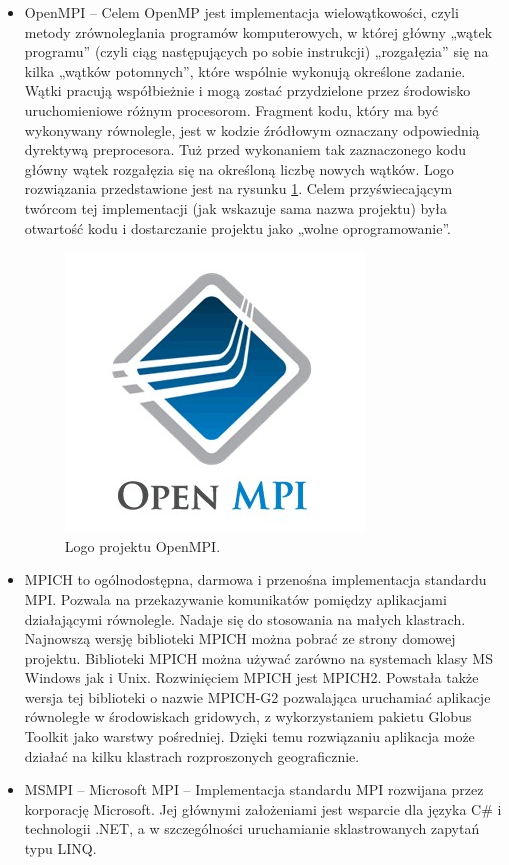 \documentclass[10pt,a4paper,titlepage,twoside]{report}
\begin{document}
\begin{itemize}
	\item OpenMPI – Celem OpenMP jest implementacja wielowątkowości, czyli metody zrównoleglania programów komputerowych, w której główny „wątek programu” (czyli ciąg następujących po sobie instrukcji) „rozgałęzia” się na kilka „wątków potomnych”, które wspólnie wykonują określone zadanie. Wątki pracują współbieżnie i mogą zostać przydzielone przez środowisko uruchomieniowe różnym procesorom. Fragment kodu, który ma być wykonywany równolegle, jest w kodzie źródłowym oznaczany odpowiednią dyrektywą preprocesora. Tuż przed wykonaniem tak zaznaczonego kodu główny wątek rozgałęzia się na określoną liczbę nowych wątków. Logo rozwiązania przedstawione jest na rysunku \ref{mpi_logo}. Celem przyświecającym twórcom tej implementacji (jak wskazuje sama nazwa projektu) była otwartość kodu i dostarczanie projektu jako „wolne oprogramowanie”.
	\begin{figure}[ht!]
		\centering
		\includegraphics[scale=0.7]{pics/mpi.jpg}
		\caption{Logo projektu OpenMPI.}
		\label{mpi_logo}
	\end{figure}
	\item MPICH to ogólnodostępna, darmowa i przenośna implementacja standardu MPI. Pozwala na przekazywanie komunikatów pomiędzy aplikacjami działającymi równolegle. Nadaje się do stosowania na małych klastrach. Najnowszą wersję biblioteki MPICH można pobrać ze strony domowej projektu. Biblioteki MPICH można używać zarówno na systemach klasy MS Windows jak i Unix. Rozwinięciem MPICH jest MPICH2. Powstała także wersja tej biblioteki o nazwie MPICH-G2 pozwalająca uruchamiać aplikacje równoległe w środowiskach gridowych, z wykorzystaniem pakietu Globus Toolkit jako warstwy pośredniej. Dzięki temu rozwiązaniu aplikacja może działać na kilku klastrach rozproszonych geograficznie.
	\item MSMPI – Microsoft MPI – Implementacja standardu MPI rozwijana przez korporację Microsoft. Jej głównymi założeniami jest wsparcie dla języka C\# i technologii .NET, a w szczególności uruchamianie sklastrowanych zapytań typu LINQ.
\end{itemize}
\end{document}
